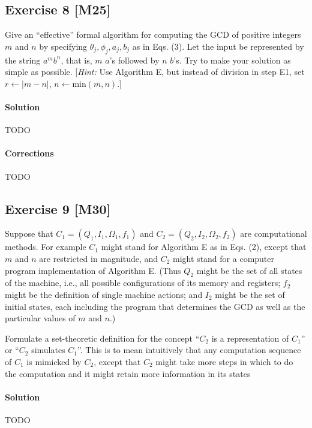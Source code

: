 \documentclass{report}
\newcommand{\say}[1]{``#1''}
\begin{document}
		
		\subsection*{Exercise 8 [M25]} 
		
			Give an \say{effective} formal algorithm for computing the GCD of positive integers $m$ and $n$ by specifying $\theta_j, \phi_j, a_j, b_j$ as in Eqs. (3). Let the input be represented by the string $a^m b^n$, that is, $m$ $a$'s followed by $n$ $b$'s. Try to make your solution as simple as possible. [\textit{Hint:} Use Algorithm E, but instead of division in step E1, set $r \leftarrow |m-n|$, $n \leftarrow \text{min}(m,n)$.]
			
			\paragraph{Solution} TODO
			
			\paragraph{Corrections} TODO
			
		
		\subsection*{Exercise 9 [M30]} 
		
			Suppose that $C_1 = (Q_1, I_1, \Omega_1, f_1)$ and $C_2 = (Q_2, I_2, \Omega_2, f_2)$ are computational methods. For example $C_1$ might stand for Algorithm E as in Eqs. (2), except that $m$ and $n$ are restricted in magnitude, and $C_2$ might stand for a computer program implementation of Algorithm E. (Thus $Q_2$ might be the set of all states of the machine, i.e., all possible configurations of its memory and registers; $f_2$ might be the definition of single machine actions; and $I_2$ might be the set of initial states, each including the program that determines the GCD as well as the particular values of $m$ and $n$.)
			
			Formulate a set-theoretic definition for the concept \say{$C_2$ is a representation of $C_1$} or \say{$C_2$ simulates $C_1$}. This is to mean intuitively that any computation sequence of $C_1$ is mimicked by $C_2$, except that $C_2$ might take more steps in which to do the computation and it might retain more information in its states
			
			\paragraph{Solution} TODO
			
\end{document}
